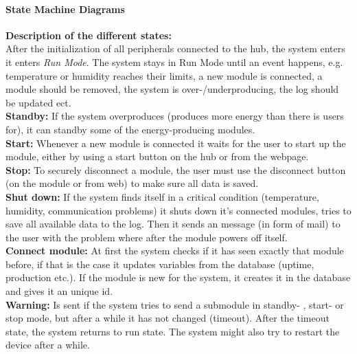 			\paragraph{State Machine Diagrams}
				\textbf{ }
				\textbf{Description of the different states: }
				\\ After the initialization of all peripherals connected to the hub, the system enters it enters \textit{Run Mode}.
				The system stays in Run Mode until an event happens, e.g. temperature or humidity reaches their limits,
				a new module is connected, a module should be removed, the system is over-/underproducing, the log should be updated ect. 
				\\\textbf{Standby: }If the system overproduces (produces more energy than there is users for), it can standby some of the energy-producing modules.
				\\\textbf{Start: }Whenever a new module is connected it waits for the user to start up the module, either by using a start button on the hub or from the webpage.
				\\\textbf{Stop: }To securely disconnect a module, the user must use the disconnect button (on the module or from web) to make sure all data is saved.
				\\\textbf{Shut down: }If the system finds itself in a critical condition (temperature, humidity, communication problems) it shuts down it's connected modules,
							        tries to save all available data to the log. Then it sends an message (in form of mail) to the user with the problem where after the module
							        powers off itself. 
				\\\textbf{Connect module: }At first the system checks if it has seen exactly that module before, if that is the case it updates variables from the database
									(uptime, production etc.). If the module is new for the system, it creates it in the database and gives it an unique id.
				\\\textbf{Warning: }Is sent if the system tries to send a submodule in standby- , start- or stop mode, but after a while it has not changed (timeout). 
							    After the timeout state, the system returns to run state. The system might also try to restart the device after a while.
				
